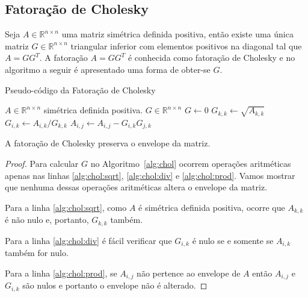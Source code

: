 \subsection{Fatoração de Cholesky}
Seja $A \in \mathbb{R}^{n \times n}$ uma matriz simétrica definida positiva, então existe
uma única matriz $G \in \mathbb{R}^{n \times n}$ triangular inferior com
elementos positivos na diagonal tal que $A = G G^T$. A fatoração $A = G G^T$ é
conhecida como fatoração de Cholesky e no algoritmo a seguir é apresentado
uma forma de obter-se $G$.
\begin{algorithm}[hbt]
    \caption{Pseudo-código da Fatoração de Cholesky}
    \label{alg:chol}
    \begin{algorithmic}[1]
        \REQUIRE $A \in \mathbb{R}^{n \times n}$ simétrica definida positiva.
        \ENSURE $G \in \mathbb{R}^{n \times n}$
        \STATE $G \longleftarrow 0$ 
            \STATE $G_{k,k} \longleftarrow \sqrt{A_{k,k}}$ \label{alg:chol:sqrt}
                \STATE $G_{i,k} \longleftarrow A_{i,k} / G_{k,k}$
                \label{alg:chol:div}
            \ENDFOR
                    \STATE $A_{i,j} \longleftarrow A_{i,j} - G_{i,k} G_{j,k}$
                    \label{alg:chol:prod}
                \ENDFOR
            \ENDFOR
        \ENDFOR
    \end{algorithmic}
\end{algorithm}

\begin{prop}
    \label{prop:pres:env}
    A fatoração de Cholesky preserva o envelope da matriz.
\end{prop}
\begin{proof}
    Para calcular $G$ no Algoritmo~\ref{alg:chol} ocorrem operações aritméticas
    apenas nas linhas \ref{alg:chol:sqrt}, \ref{alg:chol:div} e
    \ref{alg:chol:prod}. Vamos mostrar que nenhuma dessas operações aritméticas
    altera o envelope da matriz.

    Para a linha \ref{alg:chol:sqrt}, como $A$ é simétrica definida positiva,
    ocorre que $A_{k,k}$ é não nulo e, portanto, $G_{k,k}$ também.

    Para a linha \ref{alg:chol:div} é fácil verificar que $G_{i,k}$ é nulo se e
    somente se $A_{i,k}$ também for nulo.

    Para a linha \ref{alg:chol:prod}, se $A_{i,j}$ não pertence ao envelope de $A$
    então $A_{i,j}$ e $G_{i,k}$ são nulos e portanto o envelope não é alterado.
\end{proof}

